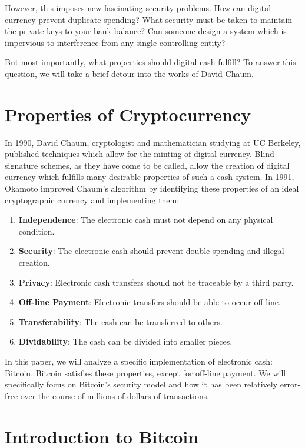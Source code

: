 \documentclass{report}
\begin{document}
However, this imposes new fascinating security problems. How can digital
currency prevent duplicate spending? What security must be taken to maintain the
private keys to your bank balance? Can someone design a system which is
impervious to interference from any single controlling entity?

But most importantly, what properties should digital cash fulfill? To answer
this question, we will take a brief detour into the works of David Chaum.

\section*{Properties of Cryptocurrency}
In 1990, David Chaum, cryptologist and mathematician studying at UC Berkeley,
published techniques which allow for the minting of digital
currency.\cite{Chaum:Cash} Blind signature schemes, as they have come to be
called, allow the creation of digital currency which fulfills many desirable
properties of such a cash system. In 1991, Okamoto improved Chaum's algorithm
by identifying these properties of an ideal cryptographic currency and
implementing them:\cite{Okamoto:Cash}

\begin{enumerate}
\item \textbf{Independence}: The electronic cash must not depend on any physical condition.
\item \textbf{Security}: The electronic cash should prevent double-spending and illegal creation.
\item \textbf{Privacy}: Electronic cash transfers should not be traceable by a third party.
\item \textbf{Off-line Payment}: Electronic transfers should be able to occur off-line.
\item \textbf{Transferability}: The cash can be transferred to others.
\item \textbf{Dividability}: The cash can be divided into smaller pieces.
\end{enumerate}

In this paper, we will analyze a specific implementation of electronic cash:
Bitcoin. Bitcoin satisfies these properties, except for off-line payment. We
will specifically focus on Bitcoin's security model and how it has been
relatively error-free over the course of millions of dollars of transactions.

\section*{Introduction to Bitcoin}
\end{document}
